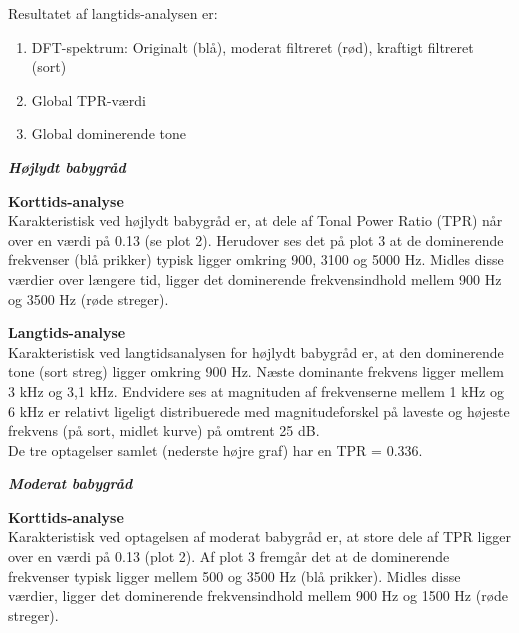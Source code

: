 Resultatet af langtids-analysen er:
\begin{enumerate}
	\item DFT-spektrum: Originalt (blå), moderat filtreret (rød), kraftigt filtreret (sort)
	\item Global TPR-værdi
	\item Global dominerende tone
\end{enumerate}

\newpage
\begin{center}  \textit{\textbf{Højlydt babygråd}}  \end{center}
\textbf{Korttids-analyse} \\
Karakteristisk ved højlydt babygråd er, at dele af Tonal Power Ratio (TPR) når over en værdi på 0.13 (se plot 2). Herudover ses det på plot 3 at de dominerende frekvenser (blå prikker) typisk ligger omkring 900, 3100 og 5000 Hz. Midles disse værdier over længere tid, ligger det dominerende frekvensindhold mellem 900 Hz og 3500 Hz (røde streger). 


\newpage
\textbf{Langtids-analyse} \\
Karakteristisk ved langtidsanalysen for højlydt babygråd er, at den dominerende tone (sort streg) ligger omkring 900 Hz. Næste dominante frekvens ligger mellem 3 kHz og 3,1 kHz. Endvidere ses at magnituden af frekvenserne mellem 1 kHz og 6 kHz er relativt ligeligt distribuerede med magnitudeforskel på laveste og højeste frekvens (på sort, midlet kurve) på omtrent 25 dB. \\
De tre optagelser samlet (nederste højre graf) har en TPR = 0.336.



\newpage
\begin{center} \textit{\textbf{Moderat babygråd}} \end{center}
\textbf{Korttids-analyse} \\
Karakteristisk ved optagelsen af moderat babygråd er, at store dele af TPR ligger over en værdi på 0.13 (plot 2). Af plot 3 fremgår det at de dominerende frekvenser typisk ligger mellem 500 og 3500 Hz (blå prikker). Midles disse værdier, ligger det dominerende frekvensindhold mellem 900 Hz og 1500 Hz (røde streger). 

